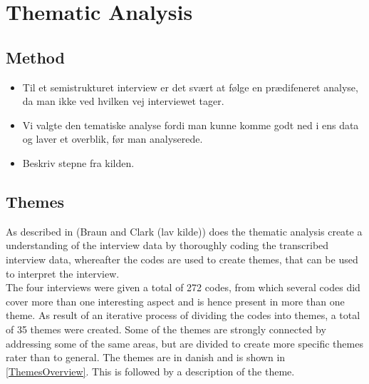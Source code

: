 \chapter{Thematic Analysis}
\label{ThemanticAnalysis}

\section{Method}
\label{ThematicMethod}

\begin{itemize}
	\item Til et semistrukturet interview er det svært at følge en prædifeneret analyse, da man ikke ved hvilken vej interviewet tager.
	\item Vi valgte den tematiske analyse fordi man kunne komme godt ned i ens data og laver et overblik, før man analyserede.
	\item Beskriv stepne fra kilden.
\end{itemize}

\section{Themes}
\label{ThematicThemes}
As described in (Braun and Clark (lav kilde)) does the thematic analysis create a understanding of the interview data by thoroughly coding the transcribed interview data, whereafter the codes are used to create themes, that can be used to interpret the interview. \\

The four interviews were given a total of 272 codes, from which several codes did cover more than one interesting aspect and is hence present in more than one theme. As result of an iterative process of dividing the codes into themes, a total of 35 themes were created. Some of the themes are strongly connected by addressing some of the same areas, but are divided to create more specific themes rater than to general. The themes are in danish and is shown in \autoref{ThemesOverview}. This is followed by a description of the theme.


